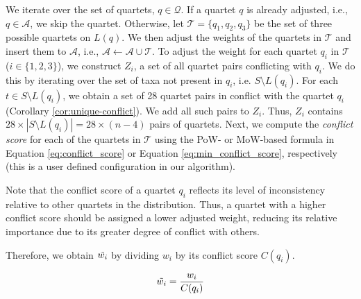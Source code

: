 \documentclass[10pt,a4paper]{article}
\newcommand{\addb}[1]{{\color{red} #1}}
\begin{document}
We iterate over the set of quartets, $q \in \mathcal{Q}$. If a quartet $q$ is already adjusted, i.e., $ q \in \mathcal{A} $, we skip the quartet. Otherwise, let $ \mathcal{T} = \{q_1, q_2, q_3\}$ be the set of three possible quartets on $L(q)$. %
We then adjust the weights of the quartets in $\mathcal{T}$ and insert them to $\mathcal{A}$, i.e., $\mathcal{A} \leftarrow \mathcal{A} \cup \mathcal{T}$. To adjust the weight for each quartet $q_i$ in $\mathcal{T}$ ($i \in \{ 1,2,3\}$), we construct $Z_i$, a set of all quartet pairs conflicting with $q_i$. %
We do this by iterating over the set of taxa not present in $q_i$, i.e. $S \setminus L(q_i)$. 
For each $t \in S \setminus L(q_i)$, we obtain a set of 28 quartet pairs in conflict with the quartet $q_i$ (Corollary \ref{cor:unique-conflict}). We add all such pairs to $Z_i$. Thus, $Z_i$ contains $28\times|S \setminus L(q_i)| = 28 \times (n-4)$ pairs of quartets. Next, we compute the \textit{conflict score} for each of the quartets in $\mathcal{T}$ using the PoW- or MoW-based formula in Equation \eqref{eq:conflict_score} or Equation \eqref{eq:min_conflict_score}, respectively (this is a user defined configuration in our algorithm).


Note that the conflict score of a quartet $q_i$ reflects its level of inconsistency relative to other quartets in the distribution. Thus, a quartet with a higher conflict score should be assigned a lower adjusted weight, reducing its relative importance due to its greater degree of conflict with others.








Therefore, we obtain $\Tilde{w_i}$ by dividing $ w_i $ %
by its conflict score $C(q_i)$.

$$
\Tilde{w_i} = \frac{w_i}{C(q_i)}
$$
\end{document}
